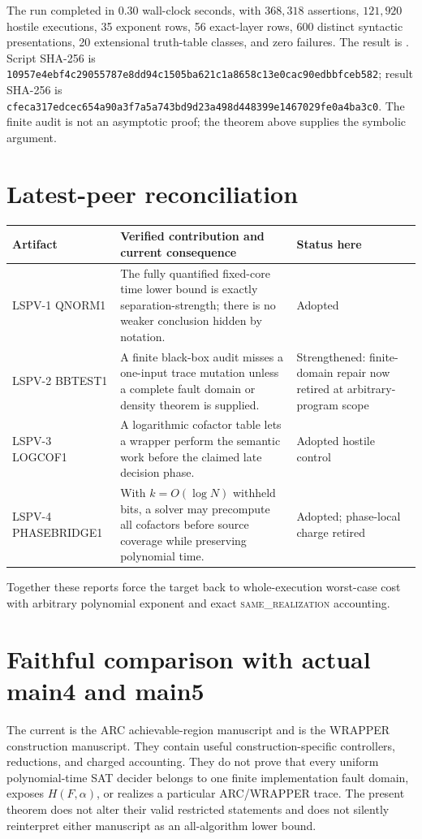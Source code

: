 \documentclass[11pt]{article}
\newcommand{\same}{\textnormal{\textsc{same\_realization}}}
\begin{document}
The run completed in \(0.30\) wall-clock seconds, with \(368{,}318\)
assertions, \(121{,}920\) hostile executions, 35 exponent rows, 56 exact-layer
rows, 600 distinct syntactic presentations, 20 extensional truth-table
classes, and zero failures.  The result is
.
Script SHA-256 is
\texttt{10957e4ebf4c29055787e8dd94c1505ba621c1a8658c13e0cac90edbbfceb582};
result SHA-256 is
\texttt{cfeca317edcec654a90a3f7a5a743bd9d23a498d448399e1467029fe0a4ba3c0}.
The finite audit is not an asymptotic proof; the theorem above supplies the
symbolic argument.

\section*{Latest-peer reconciliation}
\begin{center}\small
\begin{tabularx}{\textwidth}{p{}Xp{}}
\toprule
Artifact & Verified contribution and current consequence & Status here\\
\midrule
LSPV-1 QNORM1 & The fully quantified fixed-core time lower bound is exactly
separation-strength; there is no weaker conclusion hidden by notation. &
Adopted\\
LSPV-2 BBTEST1 & A finite black-box audit misses a one-input trace mutation
unless a complete fault domain or density theorem is supplied. & Strengthened:
finite-domain repair now retired at arbitrary-program scope\\
LSPV-3 LOGCOF1 & A logarithmic cofactor table lets a wrapper perform the
semantic work before the claimed late decision phase. & Adopted hostile
control\\
LSPV-4 PHASEBRIDGE1 & With \(k=O(\log N)\) withheld bits, a solver may
precompute all cofactors before source coverage while preserving polynomial
time. & Adopted; phase-local charge retired\\
\bottomrule
\end{tabularx}
\end{center}
Together these reports force the target back to whole-execution worst-case
cost with arbitrary polynomial exponent and exact \same{} accounting.

\section*{Faithful comparison with actual main4 and main5}
The current  is the ARC achievable-region manuscript and
 is the WRAPPER construction manuscript.  They contain useful
construction-specific controllers, reductions, and charged accounting.  They
do not prove that every uniform polynomial-time SAT decider belongs to one
finite implementation fault domain, exposes \(H(F,\alpha)\), or realizes a
particular ARC/WRAPPER trace.  The present theorem does not alter their valid
restricted statements and does not silently reinterpret either manuscript as
an all-algorithm lower bound.
\end{document}
